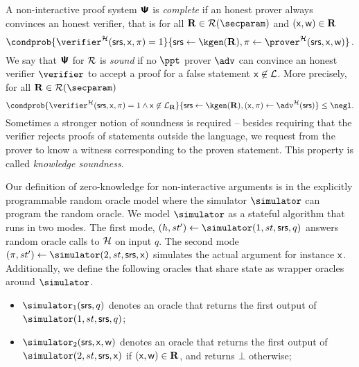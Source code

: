   A non-interactive proof system $\bm{\mathsf{\Psi}}$ is
  \emph{complete} if an honest prover always convinces an honest verifier, that
  is for all $\REL \in \RELGEN(\secparam)$ and $(\mathsf{x}, \mathsf{w}) \in \mathbf{R}$
	\[
		\condprob{\verifier^\ro (\srs, \inp, \zkproof) = 1} {\srs \gets \kgen(\REL),
      \zkproof \gets \prover^\ro (\srs, \inp, \wit)}\,.
	\]
    We say that $\bm{\mathsf{\Psi}}$ for $\mathcal{R}$ is \emph{sound} if no
  $\ppt$ prover $\adv$ can convince an honest verifier $\verifier$ to accept a
  proof for a false statement $\mathsf{x} \not\in\mathcal{L}$. More precisely, for
  all $\REL \in \RELGEN(\secparam)$
	\[
    \condprob{ \verifier^\ro (\srs, \inp, \zkproof) = 1 \land \inp \not\in
      \LANG_\REL}{\srs \gets \kgen(\REL), (\inp, \zkproof) \gets \adv^\ro(\srs)} \leq
    \negl.
	\]
Sometimes a stronger notion of soundness is required -- besides requiring that the
verifier rejects proofs of statements outside the language, we request from the
prover to know a witness corresponding to the proven statement. This property is
called \emph{knowledge soundness}.%
 
  Our definition of zero-knowledge for non-interactive
arguments is in the explicitly programmable random oracle model where the simulator
$\simulator$ can program the random oracle. We model $\simulator$ as a stateful
algorithm that runs in two modes. The first mode,
$(h, st') \gets \simulator (1, st, \srs, q)$ answers random oracle calls to $\mathcal{H}$ on input
$q$. The second mode $(\zkproof, st') \gets \simulator (2, st, \srs, \inp)$ simulates the
actual argument for instance $\mathsf{x}$.  Additionally, we define the
following oracles that share state as wrapper oracles around $\simulator$.
\begin{itemize}
\item $\simulator_1 (\srs,q)$ denotes an oracle that returns the first output of
  $\simulator (1, st, \srs, q)$;
\item $\simulator_2 (\srs,\inp, \wit)$ denotes an oracle that returns the first output of
  $\simulator (2, st, \srs, \inp)$ if $(\mathsf{x}, \mathsf{w}) \in \mathbf{R}$, and returns $\bot$ otherwise;
\end{itemize}

